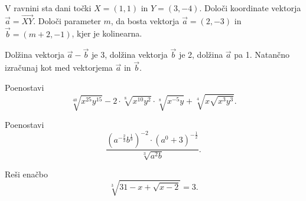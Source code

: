 \documentclass{izpit}
\begin{document}
\naloga[\tocke{4}]
  V ravnini sta dani točki $X=(1,1)$ in $Y=(3,-4)$.
  \podnaloga[1] Določi koordinate vektorja $\vec{a}=\vec{XY}$.
  \prostor[1]
  \podnaloga[3]
  Določi parameter $m$, da bosta vektorja $\vec{a}=(2,-3)$ in $\vec{b}=(m+2,-1)$, kjer je  kolinearna.
  \prostor[1]
  
\naloga*[\tocke{5}]
  Dolžina vektorja $\vec{a}-\vec{b}$ je 3, dolžina vektorja $\vec{b}$ je 2, dolžina $\vec{a}$ pa 1. Natančno izračunaj kot med vektorjema $\vec{a}$ in $\vec{b}$.
  \prostor[2]

\naloga[\tocke{4}]
  Poenostavi%
  \[\sqrt[40]{x^{25}y^{15}}-2\cdot \sqrt[8]{x^{10}y^{2}}\cdot\sqrt[8]{x^{-5}y}+\sqrt[4]{x\sqrt{x^3 y^3}}.\]
  \prostor[1]


\naloga*[\tocke{4}]%
  Poenostavi
  \[\frac{\left(a^{-\frac{2}{3}}b^{\frac{1}{9}}\right)^{-2}\cdot\left(a^0 +3\right)^{-\frac{1}{2}}}{\sqrt[3]{a^2 b}}.\]
  \prostor[1]

\naloga[\tocke{5}]
  Reši enačbo
  \[\sqrt[3]{31-x+\sqrt{x-2}}=3.\]
\end{document}

